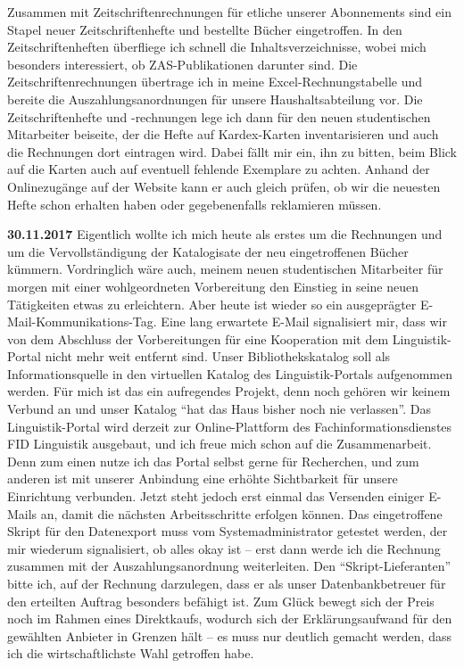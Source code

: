 \documentclass[a4paper,
fontsize=11pt,
oneside,
numbers=noperiodatend,
parskip=half-,
bibliography=totoc,
final
]{scrartcl}
\begin{document}
Zusammen mit Zeitschriftenrechnungen für etliche unserer Abonnements
sind ein Stapel neuer Zeitschriftenhefte und bestellte Bücher
eingetroffen. In den Zeitschriftenheften überfliege ich schnell die
Inhaltsverzeichnisse, wobei mich besonders interessiert, ob
ZAS-Publikationen darunter sind. Die Zeitschriftenrechnungen übertrage
ich in meine Excel-Rechnungstabelle und bereite die
Auszahlungsanordnungen für unsere Haushaltsabteilung vor. Die
Zeitschriftenhefte und -rechnungen lege ich dann für den neuen
studentischen Mitarbeiter beiseite, der die Hefte auf Kardex-Karten
inventarisieren und auch die Rechnungen dort eintragen wird. Dabei fällt
mir ein, ihn zu bitten, beim Blick auf die Karten auch auf eventuell
fehlende Exemplare zu achten. Anhand der Onlinezugänge auf der Website
kann er auch gleich prüfen, ob wir die neuesten Hefte schon erhalten
haben oder gegebenenfalls reklamieren müssen.

\textbf{30.11.2017} Eigentlich wollte ich mich heute als erstes um die
Rechnungen und um die Vervollständigung der Katalogisate der neu
eingetroffenen Bücher kümmern. Vordringlich wäre auch, meinem neuen
studentischen Mitarbeiter für morgen mit einer wohlgeordneten
Vorbereitung den Einstieg in seine neuen Tätigkeiten etwas zu
erleichtern. Aber heute ist wieder so ein ausgeprägter
E-Mail-Kommunikations-Tag. Eine lang erwartete E-Mail signalisiert mir,
dass wir von dem Abschluss der Vorbereitungen für eine Kooperation mit
dem Linguistik-Portal nicht mehr weit entfernt sind. Unser
Bibliothekskatalog soll als Informationsquelle in den virtuellen Katalog
des Linguistik-Portals aufgenommen werden. Für mich ist das ein
aufregendes Projekt, denn noch gehören wir keinem Verbund an und unser
Katalog \enquote{hat das Haus bisher noch nie verlassen}. Das
Linguistik-Portal wird derzeit zur Online-Plattform des
Fachinformationsdienstes FID Linguistik ausgebaut, und ich freue mich
schon auf die Zusammenarbeit. Denn zum einen nutze ich das Portal selbst
gerne für Recherchen, und zum anderen ist mit unserer Anbindung eine
erhöhte Sichtbarkeit für unsere Einrichtung verbunden. Jetzt steht
jedoch erst einmal das Versenden einiger E-Mails an, damit die nächsten
Arbeitsschritte erfolgen können. Das eingetroffene Skript für den
Datenexport muss vom Systemadministrator getestet werden, der mir
wiederum signalisiert, ob alles okay ist -- erst dann werde ich die
Rechnung zusammen mit der Auszahlungsanordnung weiterleiten. Den
\enquote{Skript-Lieferanten} bitte ich, auf der Rechnung darzulegen,
dass er als unser Datenbankbetreuer für den erteilten Auftrag besonders
befähigt ist. Zum Glück bewegt sich der Preis noch im Rahmen eines
Direktkaufs, wodurch sich der Erklärungsaufwand für den gewählten
Anbieter in Grenzen hält -- es muss nur deutlich gemacht werden, dass
ich die wirtschaftlichste Wahl getroffen habe.
\end{document}
